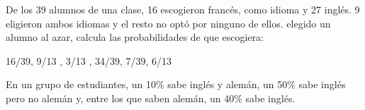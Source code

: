 \documentclass[addpoints,spanish, 12pt,a4paper]{exam}
\begin{document}
\begin{questions}

\question[3] De los 39 alumnos de una clase,
16 escogieron francés, como idioma y 27 inglés.
9 eligieron ambos idiomas y el resto no optó por ninguno de ellos. elegido un alumno al azar, calcula las probabilidades de que escogiera:
\begin{multicols}{2}
\end{multicols}
\begin{solution}
    16/39, 9/13 , 3/13 , 34/39, 7/39, 6/13
\end{solution}


\question En un grupo de estudiantes, un 10\% sabe inglés y alemán, un 50\% sabe inglés pero no alemán y, entre los que saben alemán, un 40\% sabe inglés.
\end{questions}
\end{document}
